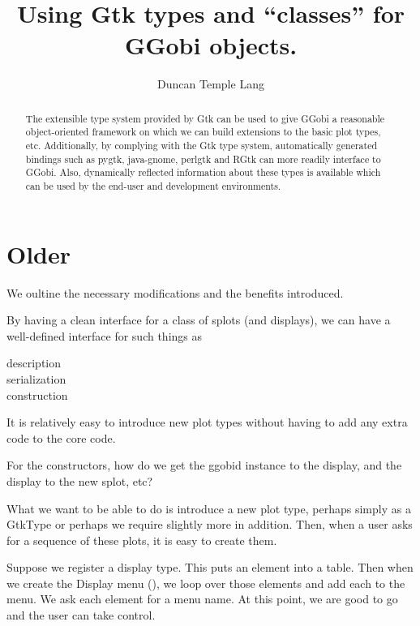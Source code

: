\documentclass{article}
\title{Using Gtk types and ``classes'' for GGobi objects.}
\author{Duncan Temple Lang}
\begin{document}
\maketitle

\begin{abstract}

  The extensible type system provided by Gtk can be used to give GGobi
  a reasonable object-oriented framework on which we can build
  extensions to the basic plot types, etc.  Additionally, by complying
  with the Gtk type system, automatically generated bindings such as
  pygtk, java-gnome, perlgtk and RGtk can more readily interface to
  GGobi.  Also, dynamically reflected information about these types is
  available which can be used by the end-user and development
  environments.

\end{abstract}






\section{Older}

We oultine the necessary modifications and the benefits introduced.

By having a clean interface for a class of splots
(and displays), we can have a well-defined interface
for such things as 
\begin{description}
\item[description]
\item[serialization]
\item[construction]
\end{description}

It is relatively easy to introduce new plot types
without having to add any extra code to the core code.

For the constructors, how do we get the ggobid instance to the
display, and the display to the new splot, etc?

What we want to be able to do is introduce a new plot type, perhaps
simply as a GtkType or perhaps we require slightly more in addition.
Then, when a user asks for a sequence of these plots, it is easy to
create them.

Suppose we register a display type.  This puts an element into a
table.  Then when we create the Display menu
(), we loop over those elements and add
each to the menu.  We ask each element for a menu name.  At this
point, we are good to go and the user can take control.
\end{document}
